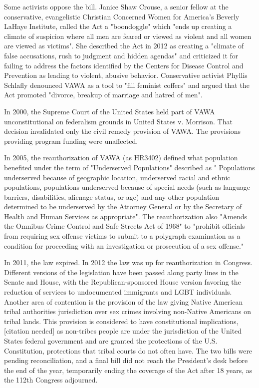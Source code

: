 Some activists oppose the bill. Janice Shaw Crouse, a senior fellow at
the conservative, evangelistic Christian Concerned Women for America's
Beverly LaHaye Institute, called the Act a "boondoggle" which "ends up
creating a climate of suspicion where all men are feared or viewed as
violent and all women are viewed as victims". She described the Act in
2012 as creating a "climate of false accusations, rush to judgment and
hidden agendas" and criticized it for failing to address the factors
identified by the Centers for Disease Control and Prevention as leading
to violent, abusive behavior. Conservative activist Phyllis Schlafly
denounced VAWA as a tool to "fill feminist coffers" and argued that the
Act promoted "divorce, breakup of marriage and hatred of men".

In 2000, the Supreme Court of the United States held part of VAWA
unconstitutional on federalism grounds in United States v. Morrison.
That decision invalidated only the civil remedy provision of VAWA. The
provisions providing program funding were unaffected.

In 2005, the reauthorization of VAWA (as HR3402) defined what population
benefited under the term of "Underserved Populations" described as "
Populations underserved because of geographic location, underserved
racial and ethnic populations, populations underserved because of
special needs (such as language barriers, disabilities, alienage status,
or age) and any other population determined to be underserved by the
Attorney General or by the Secretary of Health and Human Services as
appropriate". The reauthorization also "Amends the Omnibus Crime Control
and Safe Streets Act of 1968" to "prohibit officials from requiring sex
offense victims to submit to a polygraph examination as a condition for
proceeding with an investigation or prosecution of a sex offense."

In 2011, the law expired. In 2012 the law was up for reauthorization in
Congress. Different versions of the legislation have been passed along
party lines in the Senate and House, with the Republican-sponsored House
version favoring the reduction of services to undocumented immigrants
and LGBT individuals. Another area of contention is the provision of the
law giving Native American tribal authorities jurisdiction over sex
crimes involving non-Native Americans on tribal lands. This provision is
considered to have constitutional implications,{[}citation needed{]} as
non-tribes people are under the jurisdiction of the United States
federal government and are granted the protections of the U.S.
Constitution, protections that tribal courts do not often have. The two
bills were pending reconciliation, and a final bill did not reach the
President's desk before the end of the year, temporarily ending the
coverage of the Act after 18 years, as the 112th Congress adjourned.

